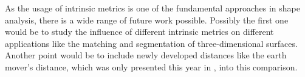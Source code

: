 As the usage of intrinsic metrics is one of the fundamental  approaches in shape analysis, there is a wide range of future work possible.
Possibly the first one would be to study the influence of different intrinsic metrics on different applications like the matching and segmentation of three-dimensional surfaces.
Another point would be to include newly developed distances like the earth mover's distance, which was only presented this year in \cite{solomon2014earth}, into this comparison.
